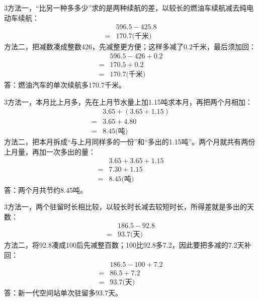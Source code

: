 \documentclass[multi=snippet,border={5bp 20bp 5bp 5bp}]{standalone}
\newenvironment{snippet}[3]{\begin{minipage}{#1bp}\color{answerred}\fontsize{#2}{#3}\selectfont\raggedright}{\end{minipage}}
\begin{document}
\begin{snippet}{505}{11.5}{14}\begin{multicols}{3}\raggedcolumns 方法一，“比另一种多多少”求的是两种续航的差，以较长的燃油车续航减去纯电动车续航：\[\begin{aligned}&596.5-425.8\\={}&170.7\text{(千米)}\end{aligned}\]方法二，把减数凑成整数426，先减整更方便；这样多减了0.2千米，最后须加回：\[\begin{aligned}&596.5-426+0.2\\={}&170.5+0.2\\={}&170.7\text{(千米)}\end{aligned}\]答：燃油汽车的单次续航多170.7千米。\end{multicols}\end{snippet}
\begin{snippet}{505}{11.5}{14}\begin{multicols}{3}\raggedcolumns 方法一，本月比上月多，先在上月节水量上加1.15吨求本月，再把两个月相加：\[\begin{aligned}&3.65+(3.65+1.15)\\={}&3.65+4.80\\={}&8.45\text{(吨)}\end{aligned}\]方法二，把本月拆成“与上月同样多的一份”和“多出的1.15吨”。两个月就共有两份上月量，再加一次多出的量：\[\begin{aligned}&3.65+3.65+1.15\\={}&7.30+1.15\\={}&8.45\text{(吨)}\end{aligned}\]答：两个月共节约8.45吨。\end{multicols}\end{snippet}
\begin{snippet}{505}{11.5}{14}\begin{multicols}{3}\raggedcolumns 方法一，两个驻留时长相比较，以较长时长减去较短时长，所得差就是多出的天数：\[\begin{aligned}&186.5-92.8\\={}&93.7\text{(天)}\end{aligned}\]方法二，将92.8凑成100后先减整百数；100比92.8多7.2，因此要把多减的7.2天补回：\[\begin{aligned}&186.5-100+7.2\\={}&86.5+7.2\\={}&93.7\text{(天)}\end{aligned}\]答：新一代空间站单次驻留多93.7天。\end{multicols}\end{snippet}
\end{document}
